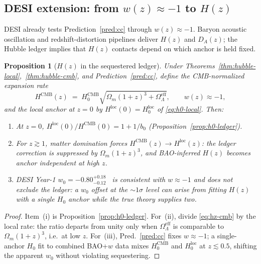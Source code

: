 \documentclass[11pt]{article}
\theoremstyle{plain}
\newtheorem{proposition}[theorem]{Proposition}
\theoremstyle{definition}
\theoremstyle{remark}
\numberwithin{equation}{section}
\begin{document}
\subsection{DESI extension: from $w(z)\approx -1$ to $H(z)$}
\label{sec:cosmology:desi-hz}

DESI already tests Prediction~\ref{pred:cc} through $w(z)\approx -1$.
Baryon acoustic oscillation and redshift-distortion pipelines deliver
$H(z)$ and $D_A(z)$; the Hubble ledger implies that $H(z)$ contacts depend on
which anchor is held fixed.

\begin{proposition}[$H(z)$ in the sequestered ledger]
\label{prop:hz-ledger}
Under Theorems~\ref{thm:hubble-local},~\ref{thm:hubble-cmb}, and
Prediction~\ref{pred:cc}, define the CMB-normalized expansion rate
\begin{equation}\label{eq:hz-cmb}
  H^{\mathrm{CMB}}(z)
  \;=\;
  H_0^{\mathrm{CMB}}
  \sqrt{
    \Omega_m(1+z)^3+\Omega_\Lambda^{\mathrm{eff}}
  },
  \qquad
  w(z)\approx -1,
\end{equation}
and the local anchor at $z=0$ by $H^{\mathrm{loc}}(0)=H_0^{\mathrm{loc}}$ of
\eqref{eq:h0-local}. Then:
\begin{enumerate}[label=(\roman*),leftmargin=*]
  \item At $z=0$, $H^{\mathrm{loc}}(0)/H^{\mathrm{CMB}}(0)=1+1/b_0$
    (Proposition~\ref{prop:h0-ledger}).
  \item For $z\gtrsim 1$, matter domination forces
    $H^{\mathrm{CMB}}(z)\to H^{\mathrm{loc}}(z)$: the ledger correction is
    suppressed by $\Omega_m(1+z)^3$, and BAO-inferred $H(z)$ becomes anchor
    independent at high $z$.
  \item DESI Year-1 $w_0=-0.80^{+0.18}_{-0.12}$~\cite{DESI2024} is
    consistent with $w\approx -1$ and does \emph{not} exclude the ledger:
    a $w_0$ offset at the $\sim 1\sigma$ level can arise from fitting
    $H(z)$ with a single $H_0$ anchor while the true theory supplies two.
\end{enumerate}
\end{proposition}

\begin{proof}
Item~(i) is Proposition~\ref{prop:h0-ledger}. For~(ii), divide
\eqref{eq:hz-cmb} by the local rate: the ratio departs from unity only when
$\Omega_\Lambda^{\mathrm{eff}}$ is comparable to $\Omega_m(1+z)^3$, i.e.\ at
low $z$. For~(iii), Pred.~\ref{pred:cc} fixes $w\approx -1$; a single-anchor
$H_0$ fit to combined BAO+$w$ data mixes $H_0^{\mathrm{CMB}}$ and
$H_0^{\mathrm{loc}}$ at $z\lesssim 0.5$, shifting the apparent $w_0$ without
violating sequestering.
\end{proof}
\end{document}
